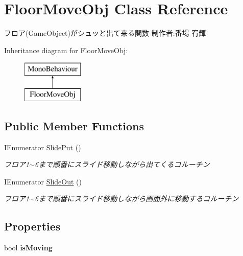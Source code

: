\hypertarget{class_floor_move_obj}{}\section{Floor\+Move\+Obj Class Reference}
\label{class_floor_move_obj}


フロア(\+Game\+Object)がシュッと出て来る関数 制作者\+:番場 宥輝  


Inheritance diagram for Floor\+Move\+Obj\+:\begin{figure}[H]
\begin{center}
\leavevmode
\includegraphics[height=2.000000cm]{class_floor_move_obj}
\end{center}
\end{figure}
\subsection*{Public Member Functions}
\begin{DoxyCompactItemize}
\item 
I\+Enumerator \hyperlink{class_floor_move_obj_a2952b0fa6b0cea5e88ddd03ca07c82ec}{Slide\+Put} ()
\begin{DoxyCompactList}\small\item\em フロア1$\sim$6まで順番にスライド移動しながら出てくるコルーチン \end{DoxyCompactList}\item 
I\+Enumerator \hyperlink{class_floor_move_obj_a66592e739e390e7bd43c0d73e112577c}{Slide\+Out} ()
\begin{DoxyCompactList}\small\item\em フロア1$\sim$6まで順番にスライド移動しながら画面外に移動するコルーチン \end{DoxyCompactList}\end{DoxyCompactItemize}
\subsection*{Properties}
\begin{DoxyCompactItemize}
\item 
\mbox{\label{class_floor_move_obj_a563f523d4fcd23fea63a5895eb8f44a5}} 
bool {\bfseries is\+Moving}
\end{DoxyCompactItemize}
